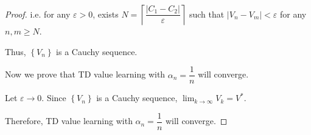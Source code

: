 \documentclass{article}
\newcommand{\set}[1]{\left\{#1\right\}}
\begin{document}
\begin{proof}
    \vspace{-1em} \hspace{1.3em}
    i.e. for any $\varepsilon>0$, exists $N=\left\lceil\dfrac{\left|C_1-C_2\right|}{\varepsilon}\right\rceil$ such that $|V_n-V_m|<\varepsilon$ for any $n,m\geq N$.
    
    \hspace{1.3em}
    Thus, $\set{V_n}$ is a Cauchy sequence.

    \vspace{2em} \hspace{1.3em}
    Now we prove that TD value learning with $\alpha_n=\dfrac{1}{n}$ will converge.

    \vspace{0.5em} \hspace{1.3em}
    Let $\varepsilon\to 0$. Since $\set{V_n}$ is a Cauchy sequence, $\lim_{k\to\infty}V_{k}=V^*$.

    \vspace{0.5em} \hspace{1.3em}
    Therefore, TD value learning with $\alpha_n=\dfrac{1}{n}$ will converge.
\end{proof}

\vspace{1em}
\end{document}
